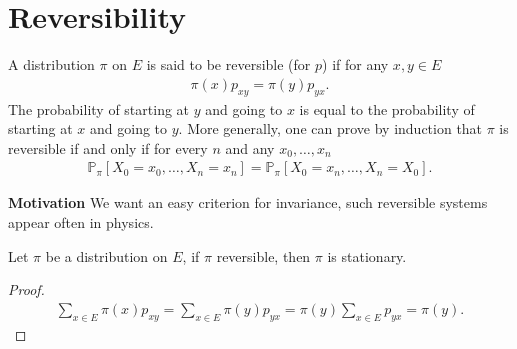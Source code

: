 \section{Reversibility}
\begin{defn}
	A distribution $\pi $ on $ E$ is said to be reversible (for $p$) if for any $x,y \in E$
\begin{align}
	\boxed{ \pi (x) p_{xy}= \pi (y)p_{yx}. }
\end{align}
The probability of starting at $y$ and going to $x$ is equal to the probability of starting at $x$ and going to $y$. More generally, one can prove by induction that $\pi $ is reversible if and only if for every $n$ and any $ x_0, \ldots ,x_n$
\begin{align}
\mathbb{P}_{\pi } \left[ X_0=x_0, \ldots ,X_n=x_n \right] = \mathbb{P}_{\pi } \left[ X_0=x_n, \ldots ,X_n=X_0 \right] .
\end{align}

\end{defn}

\textbf{Motivation} We want an easy criterion for invariance, such reversible systems appear often in physics.

\begin{prop}[]
	Let $\pi $ be a distribution on $E$, if $\pi $ reversible, then $\pi $ is stationary.
\end{prop}
\begin{proof}
	\begin{align}
		\sum_{x \in E}^{} \pi (x)p_{xy} = \sum_{x \in E}^{} \pi (y) p_{yx} = \pi (y) \sum_{x \in E}^{} p_{yx} = \pi(y) 
	.\end{align}	
\end{proof}

